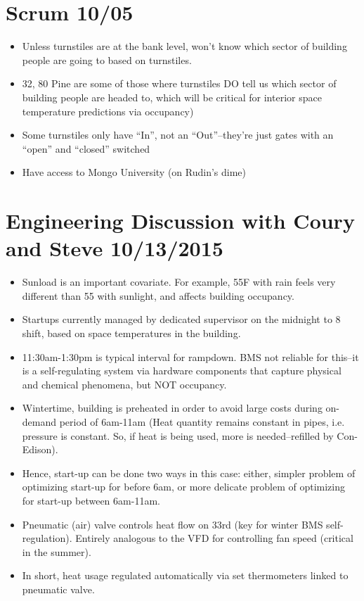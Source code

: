 \documentclass[12pt]{article}
\begin{document}
\section*{Scrum 10/05}
\begin{itemize}
	\item Unless turnstiles are at the bank level, won't know which sector of
		building people are going to based on turnstiles.
	\item 32, 80 Pine are some of
		those where turnstiles DO tell us which sector of building people are
		headed to, which will be critical for interior space temperature
		predictions via occupancy)
	\item Some turnstiles only have ``In'', not an ``Out''--they're just gates
		with an ``open'' and ``closed'' switched
	\item Have access to Mongo University (on Rudin's dime)
\end{itemize}
\section*{Engineering Discussion with Coury and Steve 10/13/2015}
\begin{itemize}
	\item Sunload is an important covariate. For example, 55F with rain feels
		very different than 55 with sunlight, and affects building occupancy.
	\item Startups currently managed by dedicated supervisor on the midnight to
		8 shift, based on space temperatures in the building.
	\item 11:30am-1:30pm is typical interval for rampdown. BMS not reliable for
		this--it is a self-regulating system via hardware components that capture
		physical and chemical phenomena, but NOT occupancy. 	
	\item Wintertime, building is preheated in order to avoid large costs during
		on-demand period of 6am-11am (Heat quantity remains constant in pipes, i.e.
		pressure is constant. So, if heat is being used, more is needed--refilled by Con-Edison). 
	\item Hence, start-up can be done two ways in this
		case: either, simpler problem of optimizing start-up for before 6am, or more
		delicate problem of optimizing for start-up between 6am-11am.
	\item Pneumatic (air) valve controls heat flow on 33rd (key for winter BMS
		self-regulation). Entirely analogous to the VFD
		for controlling fan speed (critical in the summer). 
	\item In short, heat usage regulated automatically via set thermometers
		linked to pneumatic valve. 
\end{itemize}
\end{document}
